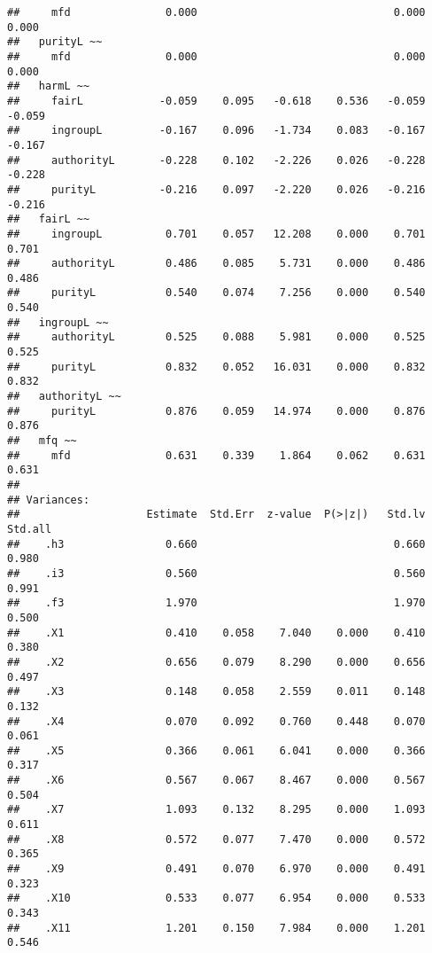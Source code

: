 \documentclass[english,man]{apa6}
\newcounter{author}
\theoremstyle{definition}
\theoremstyle{definition}
\theoremstyle{definition}
\theoremstyle{remark}
\begin{document}
\begin{verbatim}
##     mfd               0.000                               0.000    0.000
##   purityL ~~                                                            
##     mfd               0.000                               0.000    0.000
##   harmL ~~                                                              
##     fairL            -0.059    0.095   -0.618    0.536   -0.059   -0.059
##     ingroupL         -0.167    0.096   -1.734    0.083   -0.167   -0.167
##     authorityL       -0.228    0.102   -2.226    0.026   -0.228   -0.228
##     purityL          -0.216    0.097   -2.220    0.026   -0.216   -0.216
##   fairL ~~                                                              
##     ingroupL          0.701    0.057   12.208    0.000    0.701    0.701
##     authorityL        0.486    0.085    5.731    0.000    0.486    0.486
##     purityL           0.540    0.074    7.256    0.000    0.540    0.540
##   ingroupL ~~                                                           
##     authorityL        0.525    0.088    5.981    0.000    0.525    0.525
##     purityL           0.832    0.052   16.031    0.000    0.832    0.832
##   authorityL ~~                                                         
##     purityL           0.876    0.059   14.974    0.000    0.876    0.876
##   mfq ~~                                                                
##     mfd               0.631    0.339    1.864    0.062    0.631    0.631
## 
## Variances:
##                    Estimate  Std.Err  z-value  P(>|z|)   Std.lv  Std.all
##    .h3                0.660                               0.660    0.980
##    .i3                0.560                               0.560    0.991
##    .f3                1.970                               1.970    0.500
##    .X1                0.410    0.058    7.040    0.000    0.410    0.380
##    .X2                0.656    0.079    8.290    0.000    0.656    0.497
##    .X3                0.148    0.058    2.559    0.011    0.148    0.132
##    .X4                0.070    0.092    0.760    0.448    0.070    0.061
##    .X5                0.366    0.061    6.041    0.000    0.366    0.317
##    .X6                0.567    0.067    8.467    0.000    0.567    0.504
##    .X7                1.093    0.132    8.295    0.000    1.093    0.611
##    .X8                0.572    0.077    7.470    0.000    0.572    0.365
##    .X9                0.491    0.070    6.970    0.000    0.491    0.323
##    .X10               0.533    0.077    6.954    0.000    0.533    0.343
##    .X11               1.201    0.150    7.984    0.000    1.201    0.546

\end{verbatim}
\end{document}
